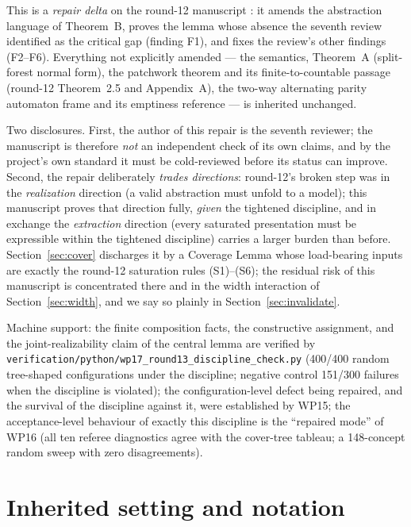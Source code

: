 \documentclass[11pt]{article}
\theoremstyle{definition}
\newcommand{\code}[1]{\texttt{#1}}
\begin{document}
This is a \emph{repair delta} on the round-12 manuscript
\cite{round12}: it amends the abstraction language of Theorem~B, proves
the lemma whose absence the seventh review \cite{fable5review} identified
as the critical gap (finding F1), and fixes the review's other findings
(F2--F6).  Everything not explicitly amended --- the semantics, Theorem~A
(split-forest normal form), the patchwork theorem and its
finite-to-countable passage (round-12 Theorem~2.5 and Appendix~A), the
two-way alternating parity automaton frame and its emptiness reference ---
is inherited unchanged.

Two disclosures.  First, the author of this repair is the seventh
reviewer; the manuscript is therefore \emph{not} an independent check of
its own claims, and by the project's own standard it must be cold-reviewed
before its status can improve.  Second, the repair deliberately
\emph{trades directions}: round-12's broken step was in the
\emph{realization} direction (a valid abstraction must unfold to a model);
this manuscript proves that direction fully, \emph{given} the tightened
discipline, and in exchange the \emph{extraction} direction (every
saturated presentation must be expressible within the tightened
discipline) carries a larger burden than before.  Section~\ref{sec:cover}
discharges it by a Coverage Lemma whose load-bearing inputs are exactly the
round-12 saturation rules (S1)--(S6); the residual risk of this manuscript
is concentrated there and in the width interaction of
Section~\ref{sec:width}, and we say so plainly in
Section~\ref{sec:invalidate}.

Machine support: the finite composition facts, the constructive
assignment, and the joint-realizability claim of the central lemma are
verified by \code{verification/python/wp17\_round13\_discipline\_check.py}
(400/400 random tree-shaped configurations under the discipline; negative
control 151/300 failures when the discipline is violated); the
configuration-level defect being repaired, and the survival of the
discipline against it, were established by WP15; the acceptance-level
behaviour of exactly this discipline is the ``repaired mode'' of WP16
(all ten referee diagnostics agree with the cover-tree tableau; a
148-concept random sweep with zero disagreements).

\section{Inherited setting and notation}\label{sec:prelim}
\end{document}
